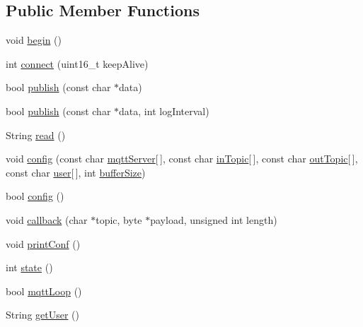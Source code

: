 \subsection*{Public Member Functions}
\begin{DoxyCompactItemize}
\item 
void \hyperlink{classCoolMQTT_ac9248808641ebf3054ed0620ea9d0100}{begin} ()
\item 
int \hyperlink{classCoolMQTT_a58b0b1f64b269c2681685208262fba1d}{connect} (uint16\+\_\+t keep\+Alive)
\item 
bool \hyperlink{classCoolMQTT_ace977b3e90ab14b1199fe5c4fb0a13ec}{publish} (const char $\ast$data)
\item 
bool \hyperlink{classCoolMQTT_a65a506641740ce797ceadd4fa8a286d3}{publish} (const char $\ast$data, int log\+Interval)
\item 
String \hyperlink{classCoolMQTT_ae3c18f6ae9723746d32765f1c8f176ca}{read} ()
\item 
void \hyperlink{classCoolMQTT_a9b703de4f1358f0ee7a5e8c44979c648}{config} (const char \hyperlink{classCoolMQTT_ab8bb951f87ddbf92db74c2ad16a3e53e}{mqtt\+Server}\mbox{[}$\,$\mbox{]}, const char \hyperlink{classCoolMQTT_a4492f52a441e83cc5151010317fdb52d}{in\+Topic}\mbox{[}$\,$\mbox{]}, const char \hyperlink{classCoolMQTT_a109c786a17b463f9eeba046194279522}{out\+Topic}\mbox{[}$\,$\mbox{]}, const char \hyperlink{classCoolMQTT_a8cd47e45d457f908d4b4390b35aaee83}{user}\mbox{[}$\,$\mbox{]}, int \hyperlink{classCoolMQTT_a7f3cf26b51d6770f216e42c5ef13ca9f}{buffer\+Size})
\item 
bool \hyperlink{classCoolMQTT_a6571671781a505feca9a8a56e256c6bc}{config} ()
\item 
void \hyperlink{classCoolMQTT_a30d82ad665bfb603f46ecdbc290775df}{callback} (char $\ast$topic, byte $\ast$payload, unsigned int length)
\item 
void \hyperlink{classCoolMQTT_a40553a0ad4b5ecf1cb4411ab54ca85fb}{print\+Conf} ()
\item 
int \hyperlink{classCoolMQTT_a5d003307eff78efbd585e42b43b72b6d}{state} ()
\item 
bool \hyperlink{classCoolMQTT_aa5eaae967b562b62cbcf2b8d81f6e5d5}{mqtt\+Loop} ()
\item 
String \hyperlink{classCoolMQTT_a373cc92fca7760d886f02d8a6e5b3f63}{get\+User} ()
\end{DoxyCompactItemize}
